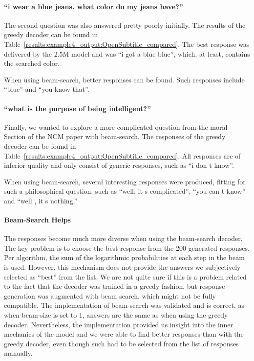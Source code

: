 \paragraph{``i wear a blue jeans. what color do my jeans have?''} The second question was also answered pretty poorly initially. The results of the greedy decoder can be found in Table~\ref{results:example4_output:OpenSubtitle_compared}. The best response was delivered by the 2.5M model and was ``i got a blue blue'', which, at least, contains the searched color.

When using beam-search, better responses can be found. Such responses include ``blue'' and ``you know that''.

\paragraph{``what is the purpose of being intelligent?''} Finally, we wanted to explore a more complicated question from the moral Section of the NCM paper with beam-search. The responses of the greedy decoder can be found in Table~\ref{results:example4_output:OpenSubtitle_compared}. All responses are of inferior quality and only consist of generic responses, such as ``i don t know''.

When using beam-search, several interesting responses were produced, fitting for such a philosophical question, such as ``well, it s complicated'', ``you can t know'' and ``well , it s nothing.''

\paragraph{Beam-Search Helps} The responses become much more diverse when using the beam-search decoder. The key problem is to choose the best response from the 200 generated responses. Per algorithm, the sum of the logarithmic probabilities at each step in the beam is used. However, this mechanism does not provide the answers we subjectively selected as ``best'' from the list. We are not quite sure if this is a problem related to the fact that the decoder was trained in a greedy fashion, but response generation was augmented with beam search, which might not be fully compatible. The implementation of beam-search was validated and is correct, as when beam-size is set to 1, answers are the same as when using the greedy decoder. Nevertheless, the implementation provided us insight into the inner mechanics of the model and we were able to find better responses than with the greedy decoder, even though such had to be selected from the list of responses manually.

